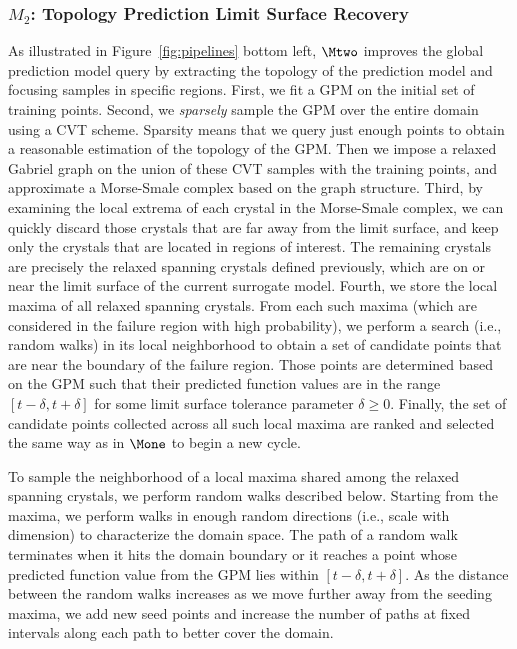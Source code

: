 \subsubsection{$M_2$: Topology Prediction Limit Surface Recovery}
As illustrated in Figure~\ref{fig:pipelines} bottom left, $\Mtwo$ improves the global prediction model query by extracting the topology of the prediction model and focusing samples in specific regions.
%
First, we fit a GPM on the initial set of training points.
%
Second, we \emph{sparsely} sample the GPM over the entire domain using a CVT scheme.
%
Sparsity means that we query just enough points to obtain a reasonable estimation of the topology of the GPM.
%
Then we impose a relaxed Gabriel graph on the union of these CVT samples with the training points, and approximate a Morse-Smale complex based on the graph structure.
%
Third, by examining the local extrema of each crystal in the Morse-Smale complex, we can quickly discard those crystals that are far away from the limit surface, and keep only the crystals that are located in regions of interest.
%
The remaining crystals are precisely the relaxed spanning crystals defined previously, which are on or near the limit surface of the current surrogate model.
%
Fourth, we store the local maxima of all relaxed spanning crystals.
%
From each such maxima (which are considered in the failure region with high probability), we perform a search (i.e., random walks) in its local neighborhood to obtain a set of candidate points that are near the boundary of the failure region.
%
Those points are determined based on the GPM such that their predicted function values are in the range $[t-\delta, t+\delta]$ for some limit surface tolerance parameter $\delta \geq 0$.
%
Finally, the set of candidate points collected across all such local maxima are ranked and selected the same way as in $\Mone$ to begin a new cycle.

To sample the neighborhood of a local maxima shared among the relaxed spanning crystals, we perform random walks described below.
%
Starting from the maxima, we perform walks in enough random directions (i.e., scale with dimension) to characterize the domain space.
%
The path of a random walk terminates when it hits the domain boundary or it reaches a point whose predicted function value from the GPM lies within $[t-\delta, t+\delta]$.
%
As the distance between the random walks increases as we move further away from the seeding maxima, we add new seed points and increase the number of paths at fixed intervals along each path to better cover the domain.

